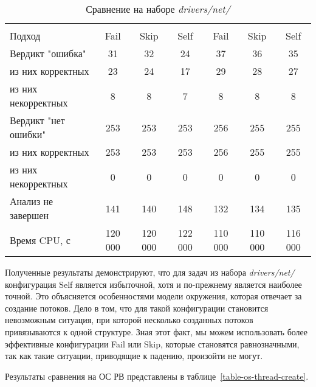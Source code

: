   \begin{table}[h]\footnotesize \centering
    \caption{Сравнение на наборе \textit{drivers/net/}}
  	\label{table-drivers-thread-create}
    \begin{tabular}{ | l | c | c | c | c | c | c |}
      \hline
      				& 		\multicolumn{3}{c|}{\theoryraces} 		& \multicolumn{3}{c|}{\combatmode} \\
      Подход         				& Fail 		& Skip 		& Self 		& Fail 	& Skip 		& Self  \\ \hline
      Вердикт "ошибка" 				& 31   		& 32   		& 24   		& 37   	& 36   		& 35   \\ 
  \hspace{0.5cm} из них корректных 	& 23 		& 24 		& 17   		& 29   	& 28   		& 27   \\ 
  \hspace{0.5cm} из них некорректных & 8 		& 8 		& 7   		& 8   	& 8   		& 8   \\ \hline
      Вердикт "нет ошибки"  		& 253    	& 253    	& 253   	& 256   & 255  		& 255   \\ 
  \hspace{0.5cm} из них корректных 	& 253 		& 253    	& 253   	& 256   & 255   	& 255   \\
  \hspace{0.5cm} из них некорректных & 0 		& 0    		& 0     	& 0   	& 0   		& 0   \\ \hline
      Анализ не завершен       		& 141    	& 140    	& 148    	& 132   & 134   	& 135   \\ \hline
      Время CPU, с   				& 120 000 	& 120 000 	& 122 000 	& 110 000 & 110 000 & 116 000   \\ 
      \hline
    \end{tabular}
  \end{table}

Полученные результаты демонстрируют, что для задач из набора \textit{drivers/net/} конфигурация Self является избыточной, хотя и по-прежнему является наиболее точной.
Это объясняется особенностями модели окружения, которая отвечает за создание потоков. 
Дело в том, что для такой конфигурации становится невозможным ситуация, при которой несколько созданных потоков привязываются к одной структуре.
Зная этот факт, мы можем использовать более эффективные конфигурации Fail или Skip, которые становятся равнозначными, так как такие ситуации, приводящие к падению, произойти не могут.

Результаты cравнения на ОС РВ представлены в таблице~\ref{table-os-thread-create}.

